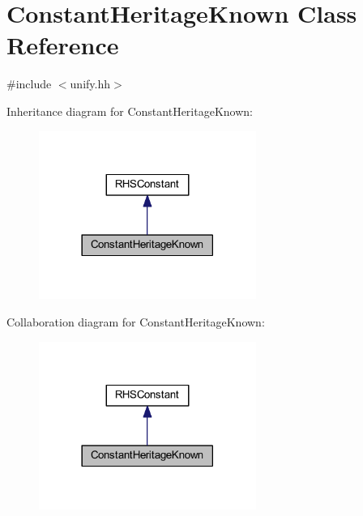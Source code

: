 \hypertarget{class_constant_heritage_known}{}\section{Constant\+Heritage\+Known Class Reference}
\label{class_constant_heritage_known}


{\ttfamily \#include $<$unify.\+hh$>$}



Inheritance diagram for Constant\+Heritage\+Known\+:
\nopagebreak
\begin{figure}[H]
\begin{center}
\leavevmode
\includegraphics[width=201pt]{class_constant_heritage_known__inherit__graph}
\end{center}
\end{figure}


Collaboration diagram for Constant\+Heritage\+Known\+:
\nopagebreak
\begin{figure}[H]
\begin{center}
\leavevmode
\includegraphics[width=201pt]{class_constant_heritage_known__coll__graph}
\end{center}
\end{figure}
